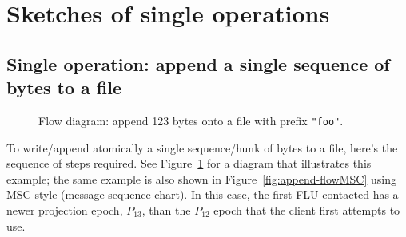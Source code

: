 \documentclass[preprint,10pt]{sigplanconf}
\begin{document}
\section{Sketches of single operations}
\label{sec:sketches}

\subsection{Single operation: append a single sequence of bytes to a file}
\label{sec:sketch-append}

\begin{figure}[htp]
\caption{Flow diagram: append 123 bytes onto a file with prefix {\tt "foo"}.}
\label{fig:append-flow}
\end{figure}

To write/append atomically a single sequence/hunk of bytes to a file,
here's the sequence of steps required.
See Figure~\ref{fig:append-flow} for a diagram that illustrates this
example; the same example is also shown in
Figure~\ref{fig:append-flowMSC} using MSC style (message sequence chart).
In
this case, the first FLU contacted has a newer projection epoch,
$P_{13}$, than the $P_{12}$ epoch that the client first attempts to use.
\end{document}
